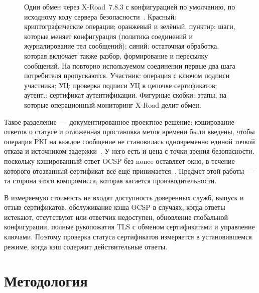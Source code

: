 \documentclass[conference,a4paper]{IEEEtran}
\newcommand{\newtext}[1]{{\color{blue}#1}}
\newcommand{\newred}[1]{{\color{red}#1}}
\begin{document}
\begin{figure}[!tb]
\caption{\newtext{Один обмен через X-Road~7.8.3 с конфигурацией по умолчанию, по исходному
коду сервера безопасности~\cite{xroadsrc}. Красный: криптографические операции; оранжевый и зелёный,
пунктир: шаги, которые меняет конфигурация (политика соединений и журналирование тел сообщений);
синий: \newred{остаточная обработка}, которая включает также разбор, формирование и пересылку сообщений. На повторно используемом соединении первые
два шага потребителя пропускаются. Участник: операция с ключом подписи участника; УЦ:
проверка подписи УЦ в цепочке сертификатов; аутент.: сертификат аутентификации. Фигурные скобки:
этапы, на которые операционный мониторинг X-Road делит обмен.}}
\label{fig:path}
\end{figure}

Такое разделение~--- документированное проектное решение: кэширование ответов о статусе и отложенная
простановка меток времени были введены, чтобы операция PKI на каждое сообщение не становилась одновременно единой точкой отказа и
источником задержки~\cite{ansper2013}. У него есть и цена с точки зрения безопасности, поскольку
кэшированный ответ OCSP без nonce оставляет окно, в течение которого отозванный сертификат всё ещё
принимается~\cite{bakhtina2023ares}. Предмет этой работы~--- та сторона этого компромисса, которая касается производительности.

\newred{В измеряемую стоимость не входят доступность доверенных служб, выпуск
и отзыв сертификатов, обслуживание кэша OCSP в случаях, когда ответы истекают, отсутствуют
или ответчик недоступен, обновление глобальной конфигурации, полные рукопожатия TLS с
обменом сертификатами и управление ключами. Поэтому проверка статуса сертификатов измеряется в
установившемся режиме, когда кэш содержит действительные ответы.}

\section{Методология}
\end{document}
